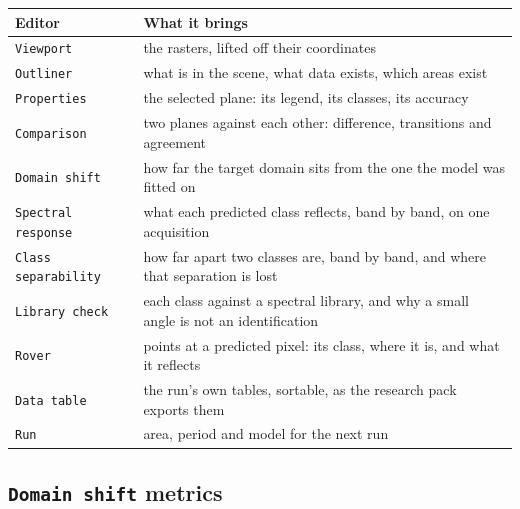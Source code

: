 \documentclass[12pt,a4paper]{article}
\begin{document}
\begin{center}
\label{tab:editors}
\small
\renewcommand{\arraystretch}{1.18}
\begin{tabular}{@{}L{3.9cm}L{11.7cm}@{}}
\toprule
\textbf{Editor} & \textbf{What it brings} \\
\midrule
\texttt{Viewport} & the rasters, lifted off their coordinates \\
\texttt{Outliner} & what is in the scene, what data exists, which areas exist \\
\texttt{Properties} & the selected plane: its legend, its classes, its accuracy \\
\texttt{Comparison} & two planes against each other: difference, transitions and agreement \\
\texttt{Domain shift} & how far the target domain sits from the one the model was fitted on \\
\texttt{Spectral response} & what each predicted class reflects, band by band, on one acquisition \\
\texttt{Class separability} & how far apart two classes are, band by band, and where that separation is lost \\
\texttt{Library check} & each class against a spectral library, and why a small angle is not an identification \\
\texttt{Rover} & points at a predicted pixel: its class, where it is, and what it reflects \\
\texttt{Data table} & the run's own tables, sortable, as the research pack exports them \\
\texttt{Run} & area, period and model for the next run \\
\bottomrule
\end{tabular}
\end{center}

\subsection{\texttt{Domain shift} metrics}
\end{document}
